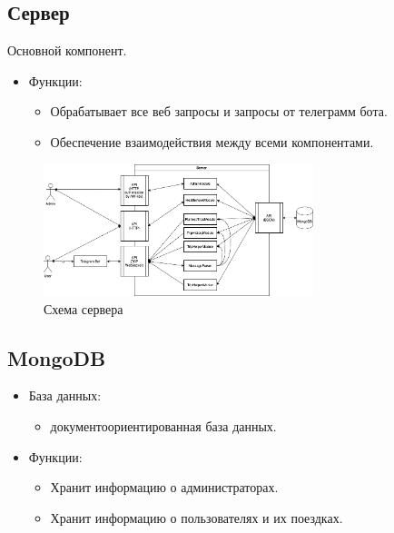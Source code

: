 \documentclass[areasetadvanced]{scrartcl}
\begin{document}
\subsection{Сервер}
Основной компонент.
\begin{itemize}
  \item Функции:
  \begin{itemize}
    \item Обрабатывает все веб запросы и запросы от телеграмм бота.
    \item Обеспечение взаимодействия между всеми компонентами.
  \end{itemize}
\end{itemize}

\begin{figure}[H]
  \centering
  \includegraphics[width=0.7\textwidth]{Server.drawio.png}
  \caption{Схема сервера}
  \label{fig:syntdiag}
\end{figure}
\newpage

\subsection{MongoDB}
\begin{itemize}
  \item База данных: 
  \begin{itemize}
    \item документоориентированная база данных.
  \end{itemize}
  \item Функции: 
  \begin{itemize}
    \item Хранит информацию о администраторах.
    \item Хранит информацию о пользователях и их поездках.
  \end{itemize}
\end{itemize}
\end{document}
